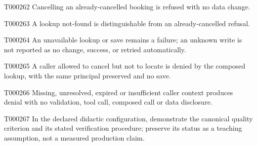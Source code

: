 \documentclass[11pt,a4paper]{article}
\begin{document}
\begin{atlasparagraph}{T000262}
Cancelling an already-cancelled booking is refused with no data change.
\end{atlasparagraph}
\begin{atlasparagraph}{T000263}
A lookup not-found is distinguishable from an already-cancelled refusal.
\end{atlasparagraph}
\begin{atlasparagraph}{T000264}
An unavailable lookup or save remains a failure; an unknown write is not reported as no change, success, or retried automatically.
\end{atlasparagraph}
\begin{atlasparagraph}{T000265}
A caller allowed to cancel but not to locate is denied by the composed lookup, with the same principal preserved and no save.
\end{atlasparagraph}
\begin{atlasparagraph}{T000266}
Missing, unresolved, expired or insufficient caller context produces denial with no validation, tool call, composed call or data disclosure.
\end{atlasparagraph}
\begin{atlasparagraph}{T000267}
In the declared didactic configuration, demonstrate the canonical quality criterion and its stated verification procedure; preserve its status as a teaching assumption, not a measured production claim.
\end{atlasparagraph}
\end{document}

